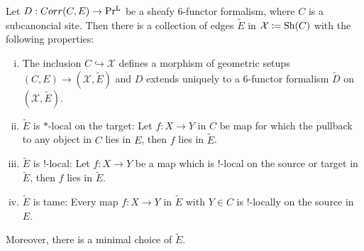 \begin{proposition}\Cite[Theorem 3.4.11]{heyer20246}\label{E' properties}
    Let $D: Corr(C,E) \to \operatorname{Pr^{L}}$ be a sheafy $6$-functor formalism, where $C$ is a subcanoncial site. Then there is a collection of edges $\tilde{E}$ in $\mathcal{X}\coloneqq \operatorname{Sh}(C)$ with the following properties:
\begin{enumerate}[(i)]
\item The inclusion $C \hookrightarrow \mathcal{X}$ defines a morphism of geometric setups $(C,E) \to (\mathcal{X},\tilde{E})$ and $D$ extends uniquely to a $6$-functor formalism $\tilde{D}$ on $ (\mathcal{X},\tilde{E})$.
    \item $\tilde{E}$ is $*$-local on the target: Let $f: X \to Y$ in $C$ be map for which the pullback to any object in $C$ lies in $E$, then $f$ lies in $\tilde{E}$. 
    \item $\tilde{E}$ is $!$-local: Let $f : X \to Y$ be a map which is $!$-local on the source or target in $\tilde{E}$, then $f$ lies in $\tilde{E}$.
    \item $\tilde{E}$ is tame: Every map $f : X \to Y$ in $\tilde{E}$ with $Y\in C$ is $!$-locally on the source in $E$.
\end{enumerate}
Moreover, there is a minimal choice of $\tilde{E}$.
\end{proposition}

